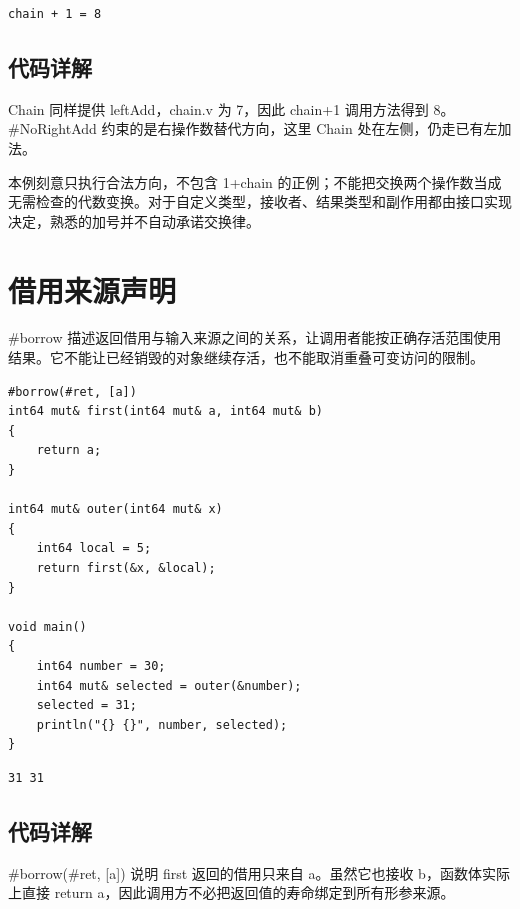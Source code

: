 \par
\medskip
\begin{lstlisting}[style=out]
chain + 1 = 8
\end{lstlisting}
\par
\medskip

\subsection*{代码详解}

Chain 同样提供 leftAdd，chain.v 为 7，因此 chain+1 调用方法得到 8。\#NoRightAdd 约束的是右操作数替代方向，这里 Chain 处在左侧，仍走已有左加法。

本例刻意只执行合法方向，不包含 1+chain 的正例；不能把交换两个操作数当成无需检查的代数变换。对于自定义类型，接收者、结果类型和副作用都由接口实现决定，熟悉的加号并不自动承诺交换律。

\section{借用来源声明}

\#borrow 描述返回借用与输入来源之间的关系，让调用者能按正确存活范围使用结果。它不能让已经销毁的对象继续存活，也不能取消重叠可变访问的限制。

\par
\medskip
\begin{lstlisting}[style=chali]
#borrow(#ret, [a])
int64 mut& first(int64 mut& a, int64 mut& b)
{
    return a;
}

int64 mut& outer(int64 mut& x)
{
    int64 local = 5;
    return first(&x, &local);
}

void main()
{
    int64 number = 30;
    int64 mut& selected = outer(&number);
    selected = 31;
    println("{} {}", number, selected);
}
\end{lstlisting}
\par
\medskip

\par
\medskip
\begin{lstlisting}[style=out]
31 31
\end{lstlisting}
\par
\medskip

\subsection*{代码详解}

\#borrow(\#ret, [a]) 说明 first 返回的借用只来自 a。虽然它也接收 b，函数体实际上直接 return a，因此调用方不必把返回值的寿命绑定到所有形参来源。


